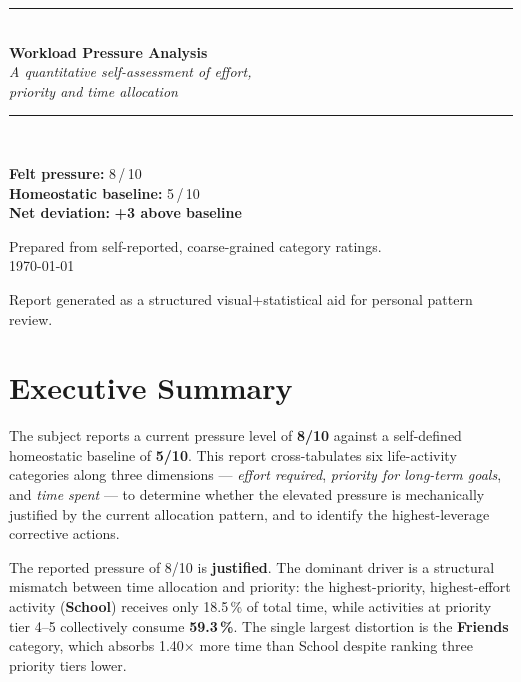 \documentclass[11pt,a4paper]{article}
\begin{document}
\begin{titlepage}
\centering
\vspace*{1.5cm}
{\color{accent}\rule{\linewidth}{1.2pt}}\\[0.5cm]
{\Huge\bfseries\color{accent} Workload Pressure Analysis}\\[0.4cm]
{\Large\itshape A quantitative self-assessment of effort,\\ priority and time allocation}\\[0.4cm]
{\color{accent}\rule{\linewidth}{1.2pt}}\\[2cm]

\begin{tcolorbox}[colback=soft,colframe=accent,width=0.7\linewidth,
  arc=4pt, halign=center]
\large\textbf{Felt pressure:} 8\,/\,10\\[2pt]
\textbf{Homeostatic baseline:} 5\,/\,10\\[2pt]
\textbf{Net deviation:} \textcolor{accent2}{\textbf{+3 above baseline}}
\end{tcolorbox}

\vspace{2cm}
{\large Prepared from self-reported, coarse-grained category ratings.}\\[0.3cm]
{\large \today}

\vfill
{\color{rule}\small Report generated as a structured visual+statistical aid for personal pattern review.}
\end{titlepage}

\section*{Executive Summary}

The subject reports a current pressure level of \textbf{8/10} against a self-defined homeostatic baseline of \textbf{5/10}. This report cross-tabulates six life-activity categories along three dimensions --- \emph{effort required}, \emph{priority for long-term goals}, and \emph{time spent} --- to determine whether the elevated pressure is mechanically justified by the current allocation pattern, and to identify the highest-leverage corrective actions.

\begin{keybox}[Verdict]
The reported pressure of 8/10 is \textbf{justified}. The dominant driver is a structural mismatch between time allocation and priority: the highest-priority, highest-effort activity (\textbf{School}) receives only 18.5\,\% of total time, while activities at priority tier 4--5 collectively consume \textbf{59.3\,\%}. The single largest distortion is the \textbf{Friends} category, which absorbs 1.40$\times$ more time than School despite ranking three priority tiers lower.
\end{keybox}
\end{document}
